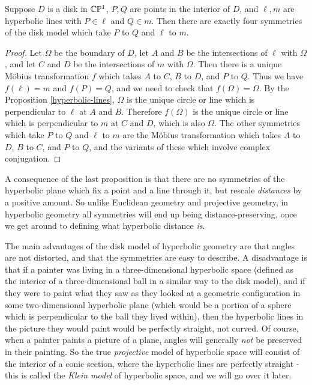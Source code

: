 \begin{prop} Suppose $D$ is a disk in $\mathbb{C}\mathbb{P}^1$, $P,Q$ are points in the interior of $D$, and $\ell, m$ are hyperbolic lines with $P \in \ell$ and $Q \in m$. Then there are exactly four symmetries of the disk model which take $P$ to $Q$ and $\ell$ to $m$.
\end{prop}
\begin{proof} Let $\Omega$ be the boundary of $D$, let $A$ and $B$ be the intersections of $\ell$ with $\Omega$, and let $C$ and $D$ be the intersections of $m$ with $\Omega$. Then there is a unique M\"obius transformation $f$ which takes $A$ to $C$, $B$ to $D$, and $P$ to $Q$. Thus we have $f(\ell) = m$ and $f(P) = Q$, and we need to check that $f(\Omega) = \Omega$. By the Proposition \ref{hyperbolic-lines}, $\Omega$ is the unique circle or line which is perpendicular to $\ell$ at $A$ and $B$. Therefore $f(\Omega)$ is the unique circle or line which is perpendicular to $m$ at $C$ and $D$, which is also $\Omega$. The other symmetries which take $P$ to $Q$ and $\ell$ to $m$ are the M\"obius transformation which takes $A$ to $D$, $B$ to $C$, and $P$ to $Q$, and the variants of these which involve complex conjugation.
\end{proof}

A consequence of the last proposition is that there are no symmetries of the hyperbolic plane which fix a point and a line through it, but rescale \emph{distances} by a positive amount. So unlike Euclidean geometry and projective geometry, in hyperbolic geometry all symmetries will end up being distance-preserving, once we get around to defining what hyperbolic distance \emph{is}.

The main advantages of the disk model of hyperbolic geometry are that angles are not distorted, and that the symmetries are easy to describe. A disadvantage is that if a painter was living in a three-dimensional hyperbolic space (defined as the interior of a three-dimensional ball in a similar way to the disk model), and if they were to paint what they saw as they looked at a geometric configuration in some two-dimensional hyperbolic plane (which would be a portion of a sphere which is perpendicular to the ball they lived within), then the hyperbolic lines in the picture they would paint would be perfectly straight, not curved. Of course, when a painter paints a picture of a plane, angles will generally \emph{not} be preserved in their painting. So the true \emph{projective} model of hyperbolic space will consist of the interior of a conic section, where the hyperbolic lines are perfectly straight - this is called the \emph{Klein model} of hyperbolic space, and we will go over it later.

